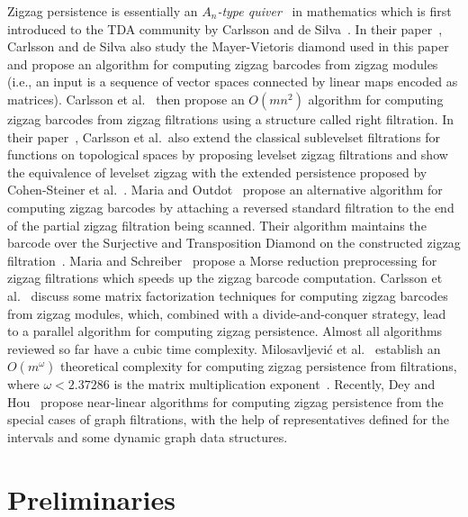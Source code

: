\documentclass[letterpaper,11pt]{article}
\theoremstyle{mythmstyle}
\theoremstyle{mydefstyle}
\theoremstyle{plain}
\theoremstyle{definition}
\newcommand{\<}[1]{\langle #1\rangle}
\newcommand{\oG}{\omega}
\begin{document}
Zigzag persistence is essentially an \emph{$A_n$-type quiver}~\cite{derksen2005quiver} in mathematics which
is first introduced to the TDA community by Carlsson and de Silva~\cite{carlsson2010zigzag}.
In their paper~\cite{carlsson2010zigzag},
Carlsson and de Silva also study the Mayer-Vietoris diamond used in this paper
and propose an algorithm for computing zigzag barcodes from zigzag modules
(i.e., an input is a sequence of vector spaces connected by linear maps encoded as
matrices).
Carlsson et al.~\cite{carlsson2009zigzag-realvalue} then propose an $O(mn^2)$ algorithm 
for computing zigzag barcodes from zigzag filtrations using a structure called right filtration.
In their paper~\cite{carlsson2009zigzag-realvalue}, Carlsson et al.\ also extend the classical sublevelset
filtrations for functions on topological spaces by proposing levelset zigzag filtrations
and show the equivalence of levelset zigzag with the extended persistence proposed by Cohen-Steiner et al.~\cite{cohen2009extending}.
Maria and Outdot~\cite{maria2014zigzag,maria2016computing}
propose an alternative algorithm for computing zigzag barcodes by 
attaching a reversed standard filtration to the end
of the partial zigzag filtration being scanned.
Their algorithm maintains the barcode over the Surjective and Transposition Diamond
on the constructed zigzag filtration~\cite{maria2014zigzag,maria2016computing}.
Maria and Schreiber~\cite{maria2019discrete} propose a Morse reduction preprocessing
for zigzag filtrations
which speeds up the zigzag barcode computation.
Carlsson et al.~\cite{carlsson2019persistent} discuss some matrix factorization techniques
for computing zigzag barcodes from zigzag modules, which, combined with a divide-and-conquer strategy, 
lead to a parallel algorithm for computing zigzag persistence.
Almost all algorithms reviewed so far have a cubic time complexity.
Milosavljevi{\'c} et al.~\cite{milosavljevic2011zigzag} establish
an $O(m^\oG)$ theoretical complexity for computing zigzag persistence from filtrations,
where $\omega< 2.37286$ is the matrix multiplication exponent~\cite{alman2021refined}.
Recently, Dey and Hou~\cite{dey2021graph} propose near-linear algorithms for computing 
zigzag persistence from the special cases of graph filtrations,
with the help of representatives defined for the intervals
and some dynamic graph data structures.

\section{Preliminaries}
\end{document}
